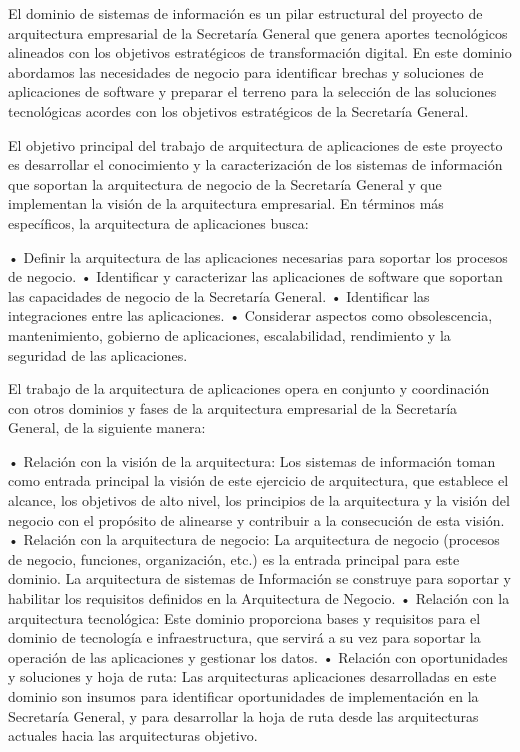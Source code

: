 \documentclass[
	a4paper, %
	12pt, %
]{include/CSSullivanBusinessReport}
\begin{document}
El dominio de sistemas de información es un pilar estructural del
proyecto de arquitectura empresarial de la Secretaría General que genera
aportes tecnológicos alineados con los objetivos estratégicos de
transformación digital. En este dominio abordamos las necesidades de
negocio para identificar brechas y soluciones de aplicaciones de
software y preparar el terreno para la selección de las soluciones
tecnológicas acordes con los objetivos estratégicos de la Secretaría
General.

El objetivo principal del trabajo de arquitectura de aplicaciones de
este proyecto es desarrollar el conocimiento y la caracterización de los
sistemas de información que soportan la arquitectura de negocio de la
Secretaría General y que implementan la visión de la arquitectura
empresarial. En términos más específicos, la arquitectura de
aplicaciones busca:

• Definir la arquitectura de las aplicaciones necesarias para soportar
los procesos de negocio. • Identificar y caracterizar las aplicaciones
de software que soportan las capacidades de negocio de la Secretaría
General. • Identificar las integraciones entre las aplicaciones. •
Considerar aspectos como obsolescencia, mantenimiento, gobierno de
aplicaciones, escalabilidad, rendimiento y la seguridad de las
aplicaciones.

El trabajo de la arquitectura de aplicaciones opera en conjunto y
coordinación con otros dominios y fases de la arquitectura empresarial
de la Secretaría General, de la siguiente manera:

• Relación con la visión de la arquitectura: Los sistemas de información
toman como entrada principal la visión de este ejercicio de
arquitectura, que establece el alcance, los objetivos de alto nivel, los
principios de la arquitectura y la visión del negocio con el propósito
de alinearse y contribuir a la consecución de esta visión. • Relación
con la arquitectura de negocio: La arquitectura de negocio (procesos de
negocio, funciones, organización, etc.) es la entrada principal para
este dominio. La arquitectura de sistemas de Información se construye
para soportar y habilitar los requisitos definidos en la Arquitectura de
Negocio. • Relación con la arquitectura tecnológica: Este dominio
proporciona bases y requisitos para el dominio de tecnología e
infraestructura, que servirá a su vez para soportar la operación de las
aplicaciones y gestionar los datos. • Relación con oportunidades y
soluciones y hoja de ruta: Las arquitecturas aplicaciones desarrolladas
en este dominio son insumos para identificar oportunidades de
implementación en la Secretaría General, y para desarrollar la hoja de
ruta desde las arquitecturas actuales hacia las arquitecturas objetivo.
\end{document}
